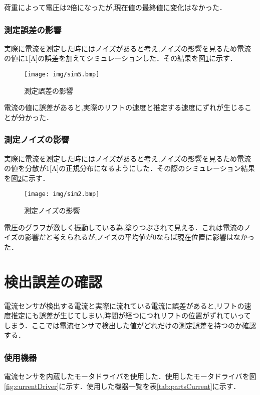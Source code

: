 荷重によって電圧は2倍になったが,現在値の最終値に変化はなかった．

\subsubsection{測定誤差の影響}
実際に電流を測定した時にはノイズがあると考え,ノイズの影響を見るため電流の値に1[A]の誤差を加えてシミュレーションした．その結果を図\ref{fig:sim5}に示す．

\begin{figure}[htbp]
 \begin{center}
    \texttt{[image: img/sim5.bmp]}
    \end{center}
  \caption{測定誤差の影響}
 \label{fig:sim5}
\end{figure}

電流の値に誤差があると,実際のリフトの速度と推定する速度にずれが生じることが分かった．

\subsubsection{測定ノイズの影響}
実際に電流を測定した時にはノイズがあると考え,ノイズの影響を見るため電流の値を分散が1[A]の正規分布になるようにした．その際のシミュレーション結果を図\ref{fig:sim2}に示す．

\begin{figure}[htbp]
 \begin{center}
    \texttt{[image: img/sim2.bmp]}
    \end{center}
  \caption{測定ノイズの影響}
 \label{fig:sim2}
\end{figure}

電圧のグラフが激しく振動している為,塗りつぶされて見える．これは電流のノイズの影響だと考えられるが,ノイズの平均値が0ならば現在位置に影響はなかった．

\section{検出誤差の確認}
電流センサが検出する電流と実際に流れている電流に誤差があると,リフトの速度推定にも誤差が生じてしまい,時間が経つにつれリフトの位置がずれていってしまう．ここでは電流センサで検出した値がどれだけの測定誤差を持つのか確認する．

\subsubsection{使用機器}
電流センサを内蔵したモータドライバを使用した．使用したモータドライバを図\ref{fig:currentDriver}に示す．使用した機器一覧を表\ref{tab:partsCurrent}に示す．

